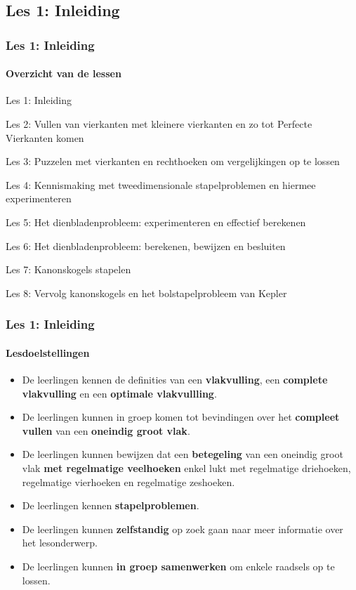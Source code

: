 \documentclass[dutch]{beamer}
\begin{document}
\subsection{Les 1: Inleiding}
\begin{frame}
\frametitle{Les 1: Inleiding}
\framesubtitle{Overzicht van de lessen}
\begin{list}{\quad}{}
\item {\color{blue}Les 1: Inleiding}
\item Les 2: Vullen van vierkanten met kleinere vierkanten en zo tot Perfecte Vierkanten komen
\item Les 3: Puzzelen met vierkanten en rechthoeken om vergelijkingen op te lossen
\item Les 4: Kennismaking met tweedimensionale stapelproblemen en hiermee experimenteren
\item Les 5: Het dienbladenprobleem: experimenteren en effectief berekenen
\item Les 6: Het dienbladenprobleem: berekenen, bewijzen en besluiten
\item Les 7: Kanonskogels stapelen
\item Les 8: Vervolg kanonskogels en het bolstapelprobleem van Kepler
\end{list}
\end{frame}

\begin{frame}
\frametitle{Les 1: Inleiding}
\framesubtitle{Lesdoelstellingen}
\begin{itemize}
\item De leerlingen kennen de definities van een \textbf{vlakvulling}, een \textbf{complete vlakvulling} en een \textbf{optimale vlakvullling}.
\item De leerlingen kunnen in groep komen tot bevindingen over het \textbf{compleet vullen} van een \textbf{oneindig groot vlak}.
\item De leerlingen kunnen bewijzen dat een \textbf{betegeling} van een oneindig groot vlak \textbf{met regelmatige veelhoeken} enkel lukt met regelmatige driehoeken, regelmatige vierhoeken en regelmatige zeshoeken.
\item De leerlingen kennen \textbf{stapelproblemen}.
\item De leerlingen kunnen \textbf{zelfstandig} op zoek gaan naar meer informatie over het lesonderwerp.
\item De leerlingen kunnen \textbf{in groep samenwerken} om enkele raadsels op te lossen.
\end{itemize}
\end{frame}
\end{document}
